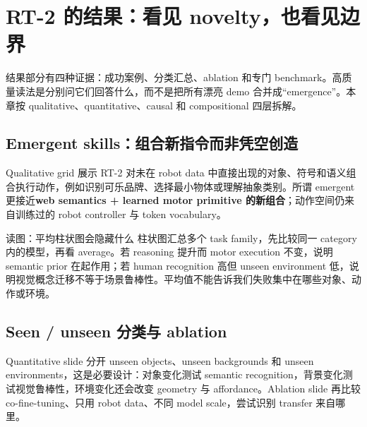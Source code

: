 \section{RT-2 的结果：看见 novelty，也看见边界}

结果部分有四种证据：成功案例、分类汇总、ablation 和专门 benchmark。高质量读法是分别问它们回答什么，而不是把所有漂亮 demo 合并成“emergence”。本章按 qualitative、quantitative、causal 和 compositional 四层拆解。

\subsection{Emergent skills：组合新指令而非凭空创造}

Qualitative grid 展示 RT-2 对未在 robot data 中直接出现的对象、符号和语义组合执行动作，例如识别可乐品牌、选择最小物体或理解抽象类别。所谓 emergent 更接近\textbf{web semantics + learned motor primitive 的新组合}；动作空间仍来自训练过的 robot controller 与 token vocabulary。



\begin{knowledgebox}{读图：平均柱状图会隐藏什么}
柱状图汇总多个 task family，先比较同一 category 内的模型，再看 average。若 reasoning 提升而 motor execution 不变，说明 semantic prior 在起作用；若 human recognition 高但 unseen environment 低，说明视觉概念迁移不等于场景鲁棒性。平均值不能告诉我们失败集中在哪些对象、动作或环境。
\end{knowledgebox}

\subsection{Seen / unseen 分类与 ablation}

Quantitative slide 分开 unseen objects、unseen backgrounds 和 unseen environments，这是必要设计：对象变化测试 semantic recognition，背景变化测试视觉鲁棒性，环境变化还会改变 geometry 与 affordance。Ablation slide 再比较 co-fine-tuning、只用 robot data、不同 model scale，尝试识别 transfer 来自哪里。


